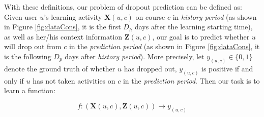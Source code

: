 

With these definitions, our problem of dropout prediction can be defined as: Given user $u$'s learning activity $\mathbf{X}(u,c)$ on course $c$ in \textit{history period} (as shown in Figure \ref{fig:dataCons}, it is the first $D_h$ days after the learning starting time), as well as her/his context information $\mathbf{Z}(u,c)$, our goal is to predict whether $u$ will drop out from $c$ in the \textit{prediction period} (as shown in Figure \ref{fig:dataCons}, it is the following $D_p$ days after \textit{history period}). More precisely, let $y_{(u,c)} \in \{0,1\}$ denote the ground truth of whether $u$ has dropped out, $y_{(u,c)}$ is positive if and only if $u$ has not taken activities on $c$ in the \textit{prediction period}. Then our task is to learn a function:

$$f: (\mathbf{X}(u,c), \mathbf{Z}(u,c))\to y_{(u,c)}$$ 



